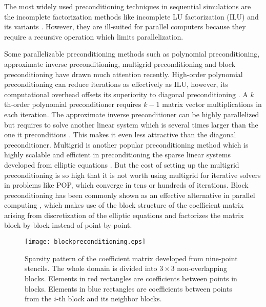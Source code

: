 The most widely used preconditioning techniques in sequential simulations are the incomplete factorization methods
like incomplete LU factorization (ILU) and its variants \cite{benzi2002preconditioning}.
However, they are ill-suited for parallel computers because they require a recursive operation which limits parallelization. 

Some parallelizable preconditioning methods such as polynomial preconditioning, 
approximate inverse preconditioning, multigrid preconditioning and block preconditioning 
have drawn much attention recently.
High-order polynomial preconditioning can reduce iterations as effectively as ILU, however,
its computational overhead offsets its superiority to diagonal preconditioning 
\cite{meyer1989numerical,smith1992parallel}. 
A $k$th-order polynomial preconditioner requires $k-1$ matrix vector multiplications in each iteration. 
The approximate inverse preconditioner can be highly parallelized but requires to
solve another linear system which is several times larger than the one it preconditions 
\cite{smith1992parallel,bergamaschi2007numerical}. 
This makes it even less attractive than the diagonal preconditioner.
Multigrid is another popular preconditioning method which is highly scalable and efficient in preconditioning the sparse linear systems developed from elliptic equations \cite{baker2012scaling}. 
But the cost of setting up the multigrid preconditioning is so high that it is not worth
using multigrid for iterative solvers in problems like POP, which converge in tens or hundreds of iterations. 
Block preconditioning has been commonly shown as an effective alternative in parallel computing 
\cite{concus1985block, white2011block},
which makes use of the block structure of the coefficient matrix
arising from discretization of the elliptic equations and factorizes the matrix block-by-block 
instead of point-by-point.

\begin {figure}
\centering
\texttt{[image: blockpreconditioning.eps]}
\caption[] {Sparsity pattern of the coefficient matrix developed from nine-point stencils. 
The whole domain is divided into $3\times3$ non-overlapping blocks.
Elements in red rectangles are coefficients between points in blocks. 
Elements in blue rectangles are coefficients between points from the $i$-th block and its neighbor blocks. \label{fig:blockprecond}}
\end{figure}

